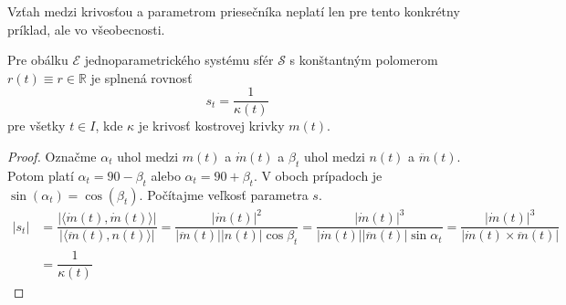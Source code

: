 Vzťah medzi krivosťou a parametrom priesečníka neplatí len pre tento konkrétny príklad, ale vo všeobecnosti.

\begin{lemma}
Pre obálku $\mathcal{E}$ jednoparametrického systému sfér $\mathcal{S}$ s konštantným polomerom $r(t) \equiv r \in \mathbb{R}$ je splnená rovnosť 
$$ s_t = \dfrac{1}{\kappa(t)} $$
pre všetky $t \in I$, kde $\kappa$ je krivosť kostrovej krivky $m(t).$
\end{lemma}

\begin{proof}
Označme $\alpha_t $ uhol medzi $m(t)$ a $\dot{m}(t)$ a $\beta_t $ uhol medzi $n(t)$ a $\ddot{m}(t)$. Potom platí $\alpha_t = 90 - \beta_t$ alebo $\alpha_t = 90 + \beta_t$. V oboch prípadoch je $\sin (\alpha_t) = \cos (\beta_t).$ Počítajme veľkosť parametra $s.$
\begin{align*}
|s_t| &= \dfrac{| \langle \dot{m}(t), \dot{m}(t) \rangle |}{ |\langle \ddot{m}(t), n(t) \rangle |} = \dfrac{| \dot{m}(t) |^2}{| \ddot{m}(t) | | n(t) | \cos \beta_t } = \dfrac{| \dot{m}(t) |^3}{| \dot{m}(t) | | \ddot{m}(t) | \sin \alpha_t } = \dfrac{| \dot{m}(t) |^3}{ | \dot{m}(t) \times \ddot{m}(t) | } \\
&= \dfrac{1}{\kappa (t)}
\end{align*} 
\end{proof}